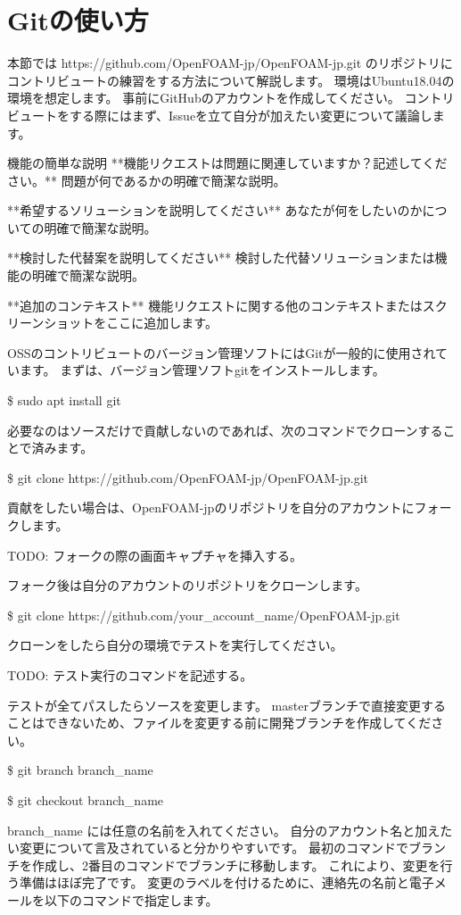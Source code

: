 \documentclass{ltjoc}
\begin{document}
\section{Gitの使い方}
本節では https://github.com/OpenFOAM-jp/OpenFOAM-jp.git 
のリポジトリにコントリビュートの練習をする方法について解説します。
環境はUbuntu18.04の環境を想定します。
事前に{GitHub}のアカウントを作成してください。
コントリビュートをする際にはまず、Issueを立て自分が加えたい変更について議論します。

機能の簡単な説明
**機能リクエストは問題に関連していますか？記述してください。**
問題が何であるかの明確で簡潔な説明。

**希望するソリューションを説明してください**
あなたが何をしたいのかについての明確で簡潔な説明。

**検討した代替案を説明してください**
検討した代替ソリューションまたは機能の明確で簡潔な説明。

**追加のコンテキスト**
機能リクエストに関する他のコンテキストまたはスクリーンショットをここに追加します。

OSSのコントリビュートのバージョン管理ソフトにはGitが一般的に使用されています。
まずは、バージョン管理ソフトgitをインストールします。

\$ sudo apt install git

必要なのはソースだけで貢献しないのであれば、次のコマンドでクローンすることで済みます。

\$ git clone https://github.com/OpenFOAM-jp/OpenFOAM-jp.git

貢献をしたい場合は、OpenFOAM-jpのリポジトリを自分のアカウントにフォークします。

TODO: フォークの際の画面キャプチャを挿入する。

フォーク後は自分のアカウントのリポジトリをクローンします。

\$ git clone https://github.com/your\_account\_name/OpenFOAM-jp.git

クローンをしたら自分の環境でテストを実行してください。

TODO: テスト実行のコマンドを記述する。

テストが全てパスしたらソースを変更します。
masterブランチで直接変更することはできないため、ファイルを変更する前に開発ブランチを作成してください。

\$ git branch branch\_name

\$ git checkout branch\_name

branch\_name には任意の名前を入れてください。
自分のアカウント名と加えたい変更について言及されていると分かりやすいです。
最初のコマンドでブランチを作成し、2番目のコマンドでブランチに移動します。
これにより、変更を行う準備はほぼ完了です。
変更のラベルを付けるために、連絡先の名前と電子メールを以下のコマンドで指定します。
\end{document}
